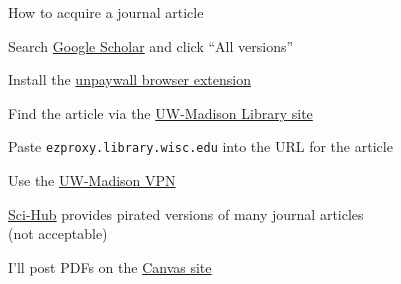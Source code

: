 \documentclass[aspectratio=169,12pt,t]{beamer}
\begin{document}
\begin{frame}[c,fragile]{How to acquire a journal article}

  \bbi

\item Search \href{https://scholar.google.com}{Google Scholar} and click ``All \uline{\mbox{\hspace{2em}}} versions''

\item Install the
  \href{https://unpaywall.org/products/extension}{unpaywall browser extension}

\item Find the article via the \href{https://library.wisc.edu}{UW-Madison Library site}

\item Paste {\tt ezproxy.library.wisc.edu} into the URL for the
  article

\item Use the
  \href{https://vpn.wisc.edu/}{UW-Madison VPN}

\item \href{https://sci-hub.se}{Sci-Hub} provides pirated versions of many
  journal articles \\
  ({\vhilit not} acceptable)

\item I'll post PDFs on the \href{https://canvas.wisc.edu/courses/529564}{Canvas site}

  \ei
\end{frame}
\end{document}
